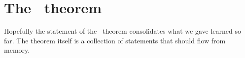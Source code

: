 \chapter[The SVD theorem]{The \svdl \ theorem}
Hopefully the statement of the \svdl \ theorem consolidates what we gave learned so far. The theorem itself is a collection of statements that should flow from memory. 









\endinput